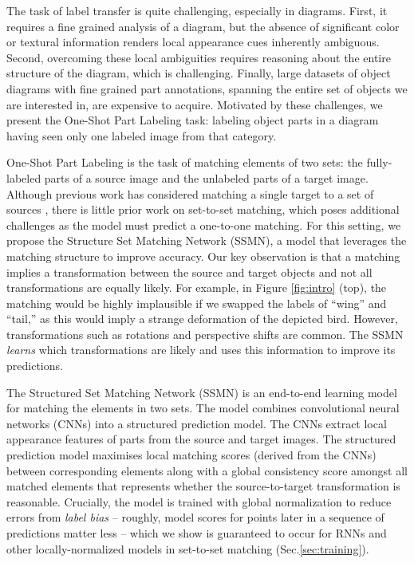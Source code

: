 \documentclass[10pt,twocolumn,letterpaper]{article}
\begin{document}
The task of label transfer is quite challenging, especially in diagrams. First, it requires a fine grained analysis of a diagram, but the absence of significant color or textural information renders local appearance cues inherently ambiguous. Second, overcoming these local ambiguities requires reasoning about the entire structure of the diagram, which is challenging. Finally, large datasets of object diagrams with fine grained part annotations, spanning the entire set of objects we are interested in, are expensive to acquire. Motivated by these challenges, we present the One-Shot Part Labeling task: labeling object parts in a diagram having seen only one labeled image from that category. 


One-Shot Part Labeling is the task of matching elements of two sets: the fully-labeled parts of a source image and the unlabeled parts of a target image. Although previous work has considered matching a single target to a set of sources \cite{Koch2015SiameseNN,vinyalsBLKW16}, there is little prior work on set-to-set matching, which poses additional challenges as the model must predict a one-to-one matching. For this setting, we propose the Structure Set Matching Network (SSMN), a model that leverages the matching structure to improve accuracy. Our key observation is that a matching implies a transformation between the source and target objects and not all transformations are equally likely. For example, in Figure \ref{fig:intro} (top), the matching would be highly implausible if we swapped the labels of ``wing'' and ``tail,'' as this would imply a strange deformation of the depicted bird. However, transformations such as rotations and perspective shifts are common. The SSMN \emph{learns} which transformations are likely and uses this information to improve its predictions.

The Structured Set Matching Network (SSMN) is an end-to-end learning model for matching the elements in two sets. The model combines convolutional neural networks (CNNs) into a structured prediction model. The CNNs extract local appearance features of parts from the source and target images. The structured prediction model maximises local matching scores (derived from the CNNs) between corresponding elements along with a global consistency score amongst all matched elements that represents whether the source-to-target transformation is reasonable. Crucially, the model is trained with global normalization to reduce errors from \emph{label bias}\cite{lafferty2001conditional} -- roughly, model scores for points later in a sequence of predictions matter less -- which we show is guaranteed to occur for RNNs and other locally-normalized models in set-to-set matching (Sec.\ref{sec:training}). 
\end{document}
